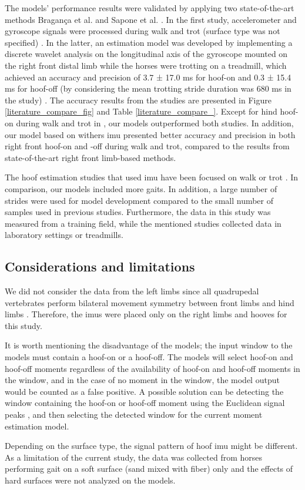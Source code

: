 The models' performance results were validated by applying two state-of-the-art methods Bragan\c{c}a et al. \cite{adsd1} and Sapone et al. \cite{sapone_2020_comparison}. In the first study, accelerometer and gyroscope signals were processed during walk and trot (surface type was not specified) \cite{adsd1}. In the latter, an estimation model was developed by implementing a discrete wavelet analysis on the longitudinal axis of the gyroscope mounted on the right front distal limb while the horses were trotting on a treadmill, which achieved an accuracy and precision of 3.7 ± 17.0 ms for hoof-on and 0.3 ± 15.4 ms for hoof-off (by considering the mean trotting stride duration was 680 ms in the study) \cite{sapone_2020_comparison}. The accuracy results from the studies are presented in Figure \ref{literature_compare_fig} and Table \ref{literature_compare_}. Except for hind hoof-on during walk and trot in \cite{adsd1}, our models outperformed both studies. In addition, our model based on withers \gls{imu} presented better accuracy and precision in both right front hoof-on and -off during walk and trot, compared to the results from state-of-the-art right front limb-based methods. 

The hoof estimation studies that used \gls{imu} have been focused on walk or trot \cite{starke_2012_accuracy,adsd1,olsen_2012_accuracy,sapone_2020_comparison}. In comparison, our models included more gaits. In addition, a large number of strides were used for model development compared to the small number of samples used in previous studies. Furthermore, the data in this study was measured from a training field, while the mentioned studies collected data in laboratory settings or treadmills.

\subsection{Considerations and limitations}

We did not consider the data from the left limbs since all quadrupedal vertebrates perform bilateral movement symmetry between front limbs and hind limbs \cite{abourachid_2003_a}. Therefore, the \gls{imu}s were placed only on the right limbs and hooves for this study.

It is worth mentioning the disadvantage of the models; the input window to the models must contain a hoof-on or a hoof-off. The models will select hoof-on and hoof-off moments regardless of the availability of hoof-on and hoof-off moments in the window, and in the case of no moment in the window, the model output would be counted as a false positive. A possible solution can be detecting the window containing the hoof-on or hoof-off moment using the Euclidean signal peaks \cite{tijssen_2020_automatic}, and then selecting the detected window for the current moment estimation model.

Depending on the surface type, the signal pattern of hoof \gls{imu} might be different. As a limitation of the current study, the data was collected from horses performing gait on a soft surface (sand mixed with fiber) only and the effects of hard surfaces were not analyzed on the models.



